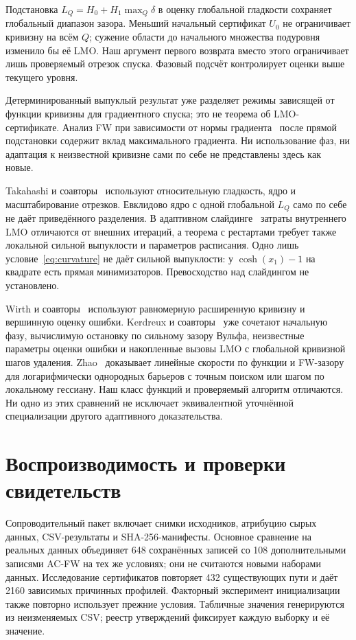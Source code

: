 Подстановка $L_Q=H_0+H_1\max_Q\delta$ в оценку глобальной
гладкости сохраняет глобальный диапазон зазора.
Меньший начальный сертификат $U_0$ не ограничивает кривизну на всём
$Q$; сужение области до начального множества подуровня изменило бы
её LMO. Наш аргумент первого возврата вместо этого ограничивает лишь
проверяемый отрезок спуска. Фазовый подсчёт контролирует оценки выше
текущего уровня.

Детерминированный выпуклый результат
\cite[приложение C.4]{lobanovkoloskova} уже разделяет режимы
зависящей от функции кривизны для градиентного спуска; это не теорема
об LMO-сертификате. Анализ FW при зависимости от нормы
градиента~\cite[теорема 5.1]{vyguzov} после прямой подстановки
содержит вклад максимального градиента. Ни использование фаз,
ни адаптация к неизвестной кривизне сами по себе не представлены
здесь как новые.

Takahashi и соавторы~\cite{bregmanfw} используют относительную
гладкость, ядро и масштабирование отрезков. Евклидово ядро с одной
глобальной $L_Q$ само по себе не даёт приведённого разделения.
В адаптивном слайдинге~\cite[теоремы 2.1 и 4.1]{adcgs} затраты
внутреннего LMO отличаются от внешних итераций, а теорема с
рестартами требует также локальной сильной выпуклости и параметров
расписания. Одно лишь условие~\eqref{eq:curvature} не даёт сильной
выпуклости: у $\cosh(x_1)-1$ на квадрате есть прямая минимизаторов.
Превосходство над слайдингом не установлено.

Wirth и соавторы~\cite[определение 2.3(b), теорема 3.6]{wirth}
используют равномерную расширенную кривизну и вершинную оценку
ошибки. Kerdreux и соавторы~\cite[утверждение 4.2, теорема 5.1]{restartfw}
уже сочетают начальную фазу, вычислимую остановку по сильному
зазору Вульфа, неизвестные параметры оценки ошибки и накопленные
вызовы LMO с глобальной кривизной шагов удаления.
Zhao~\cite[теоремы 4.1--4.2]{zhao} доказывает линейные скорости
по функции и FW-зазору для логарифмически однородных барьеров с
точным поиском или шагом по локальному гессиану. Наш класс функций
и проверяемый алгоритм отличаются. Ни одно из этих сравнений не
исключает эквивалентной уточнённой специализации другого адаптивного
доказательства.

\section{Воспроизводимость и проверки свидетельств}
\label{app:reproduction}
Сопроводительный пакет включает снимки исходников, атрибуцию сырых
данных, CSV-результаты и SHA-256-манифесты. Основное сравнение на
реальных данных объединяет 648 сохранённых записей со 108
дополнительными записями AC-FW на тех же условиях; они не считаются
новыми наборами данных. Исследование сертификатов повторяет 432
существующих пути и даёт 2160 зависимых причинных профилей.
Факторный эксперимент инициализации также повторно использует
прежние условия. Табличные значения генерируются из неизменяемых CSV;
реестр утверждений фиксирует каждую выборку и её значение.

